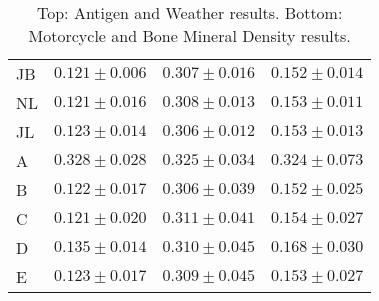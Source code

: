 \documentclass[twoside]{article} \usepackage{aistats2017}
\theoremstyle{definition}
\theoremstyle{theorem}
\begin{document}
\begin{table*}
\begin{center}
{\begin{tabular}{l|ccc}
									JB & $0.121 \pm 0.006$ & $0.307 \pm 0.016$ & $0.152 \pm 0.014$ \\
									NL & $0.121 \pm 0.016$ & $0.308 \pm 0.013$ & $0.153 \pm 0.011$ \\
									JL & $0.123 \pm 0.014$ & $\mathbf{0.306 \pm 0.012}$ & $0.153 \pm 0.013$ \\
									A & $0.328 \pm 0.028$ & $0.325 \pm 0.034$ & $0.324 \pm 0.073$ \\
									B & $0.122 \pm 0.017$ & $\mathbf{0.306 \pm 0.039}$ & $0.152 \pm 0.025$ \\
									C & $0.121 \pm 0.020$ & $0.311 \pm 0.041$ & $0.154 \pm 0.027$ \\
									D & $0.135 \pm 0.014$ & $0.310 \pm 0.045$ & $0.168 \pm 0.030$ \\
									E & $0.123 \pm 0.017$ & $0.309 \pm 0.045$ & $0.153 \pm 0.027$
								\end{tabular}}
							\end{center}
							\caption{Top: Antigen and Weather results. Bottom: Motorcycle and Bone Mineral Density results.}
							\label{table:results}
						\end{table*}
						
						
\end{document}
